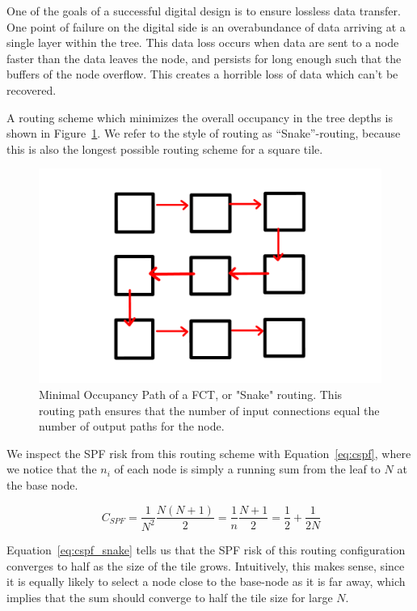 One of the goals of a successful digital design is to ensure lossless data transfer.
One point of failure on the digital side is an overabundance of data arriving at a single layer within the tree.
This data loss occurs when data are sent to a node faster than the data leaves the node, and persists for long enough such that the buffers of the node overflow.
This creates a horrible loss of data which can't be recovered.

A routing scheme which minimizes the overall occupancy in the tree depths is shown in Figure~\ref{fig:snake}.
We refer to the style of routing as ``Snake''-routing, because this is also the longest possible routing scheme for a square tile.

\begin{figure}[]
\centering
\includegraphics[width=\textwidth]{images/snakeroute.pdf}
\caption{Minimal Occupancy Path of a FCT, or "Snake" routing.
This routing path ensures that the number of input connections equal the number of output paths for the node.}
\label{fig:snake}
\end{figure}

We inspect the SPF risk from this routing scheme with Equation~\ref{eq:cspf}, where we notice that the $n_{i}$ of each node is simply a running sum from the leaf to $N$ at the base node.

\begin{equation}~\label{eq:cspf_snake}
  C_{SPF} = \frac{1}{N^{2}}\frac{N(N+1)}{2} = \frac{1}{n}\frac{N+1}{2} = \frac{1}{2} + \frac{1}{2N}
\end{equation}

Equation~\ref{eq:cspf_snake} tells us that the SPF risk of this routing configuration converges to half as the size of the tile grows.
Intuitively, this makes sense, since it is equally likely to select a node close to the base-node as it is far away, which implies that the sum should converge to half the tile size for large $N$.

